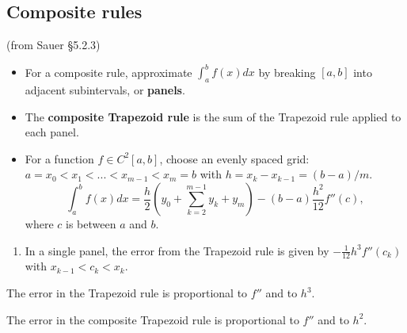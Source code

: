 \documentclass[12pt,letterpaper,noanswers]{exam}
\begin{document}
\subsection*{Composite rules}
\begin{tcolorbox}
(from Sauer \S 5.2.3)
\begin{itemize}
\itemsep0pt
    \item For a composite rule, approximate $\displaystyle\int_a^b f(x)dx$ by breaking $[a,b]$ into adjacent subintervals, or \textbf{panels}.
    \item The \textbf{composite Trapezoid rule} is the sum of the Trapezoid rule applied to each panel.
    \item For a function $f\in C^2[a,b]$, choose an evenly spaced grid: $a = x_0<x_1<...<x_{m-1}<x_m = b$ with $h = x_k-x_{k-1} = (b-a)/m$.  \[\displaystyle\int_a^b f(x)dx = \frac{h}{2}\left(y_0 + \sum\limits_{k=2}^{m-1}y_k + y_m \right) - (b-a)\frac{h^2}{12}f''(c),\] where $c$ is between $a$ and $b$.
\end{itemize}
\end{tcolorbox}
\begin{enumerate}[resume=classQ]
    \item In a single panel, the error from the Trapezoid rule is given by $-\frac{1}{12}h^3f''(c_k)$ with $x_{k-1}<c_k<x_k$.
\end{enumerate}

The error in the Trapezoid rule is proportional to $f''$ and to $h^3$.

The error in the composite Trapezoid rule is proportional to $f''$ and to $h^2$.
\end{document}
